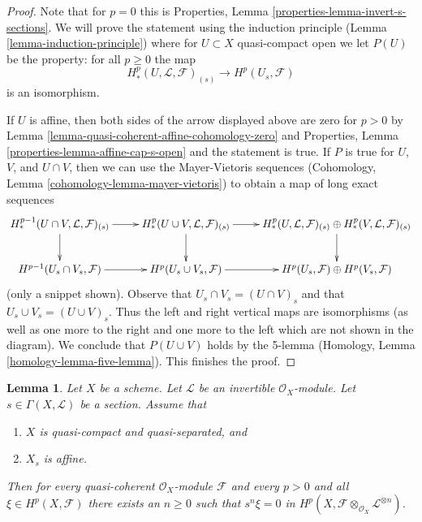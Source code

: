 \documentclass{stacks-project}
\theoremstyle{plain}
\newtheorem{lemma}[subsection]{Lemma}
\theoremstyle{definition}
\theoremstyle{remark}
\numberwithin{equation}{subsection}
\begin{document}
\begin{proof}
Note that for $p = 0$ this is
Properties, Lemma \ref{properties-lemma-invert-s-sections}.
We will prove the statement using the induction
principle (Lemma \ref{lemma-induction-principle}) where for
$U \subset X$ quasi-compact open we let $P(U)$ be the property:
for all $p \geq 0$ the map
$$
H^p_*(U, \mathcal{L}, \mathcal{F})_{(s)}
\longrightarrow
H^p(U_s, \mathcal{F})
$$
is an isomorphism.

\medskip\noindent
If $U$ is affine, then both sides of the arrow displayed above
are zero for $p > 0$ by
Lemma \ref{lemma-quasi-coherent-affine-cohomology-zero}
and
Properties, Lemma \ref{properties-lemma-affine-cap-s-open}
and the statement is true. If $P$ is true for $U$, $V$, and $U \cap V$,
then we can use the Mayer-Vietoris sequences
(Cohomology, Lemma \ref{cohomology-lemma-mayer-vietoris}) to obtain
a map of long exact sequences
$$
\xymatrix{
H^{p - 1}_*(U \cap V, \mathcal{L}, \mathcal{F})_{(s)} \ar[r] \ar[d] &
H^p_*(U \cup V, \mathcal{L}, \mathcal{F})_{(s)} \ar[r] \ar[d] &
H^p_*(U, \mathcal{L}, \mathcal{F})_{(s)}
\oplus
H^p_*(V, \mathcal{L}, \mathcal{F})_{(s)} \ar[d] \\
H^{p - 1}(U_s \cap V_s, \mathcal{F}) \ar[r]&
H^p(U_s \cup V_s, \mathcal{F}) \ar[r] &
H^p(U_s, \mathcal{F})
\oplus
H^p(V_s, \mathcal{F})
}
$$
(only a snippet shown). Observe that $U_s \cap V_s = (U \cap V)_s$ and
that $U_s \cup V_s = (U \cup V)_s$. Thus the left and right vertical
maps are isomorphisms (as well as one more to the right and one more
to the left which are not shown in the diagram).
We conclude that $P(U \cup V)$ holds by
the 5-lemma (Homology, Lemma \ref{homology-lemma-five-lemma}).
This finishes the proof.
\end{proof}

\begin{lemma}
\label{lemma-section-affine-open-kills-classes}
Let $X$ be a scheme.
Let $\mathcal{L}$ be an invertible $\mathcal{O}_X$-module.
Let $s \in \Gamma(X, \mathcal{L})$ be a section.
Assume that
\begin{enumerate}
\item $X$ is quasi-compact and quasi-separated, and
\item $X_s$ is affine.
\end{enumerate}
Then for every quasi-coherent $\mathcal{O}_X$-module $\mathcal{F}$ and
every $p > 0$ and all $\xi \in H^p(X, \mathcal{F})$ there exists
an $n \geq 0$ such that $s^n\xi = 0$ in
$H^p(X, \mathcal{F} \otimes_{\mathcal{O}_X} \mathcal{L}^{\otimes n})$.
\end{lemma}
\end{document}
